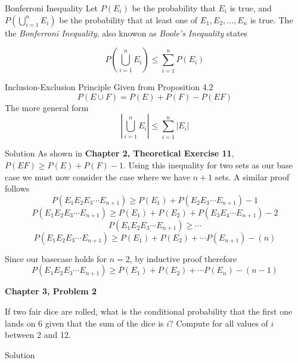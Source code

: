 \documentclass{article}
\begin{document}
\begin{spacing}{1.1}
\begin{homeworkProblem}
  \begin{homeworkSection}{Bonferroni Inequality}
    Let $P( E_i)$ be the probability that $E_i$ is true, and $P\left( \bigcup\limits_{i = 1}^{n}{ E_i}\right)$ be the probability 
    that at least one of $E_1, E_2, \dots, E_n$ is true.  The the \emph{Bonferroni Inequality}, also knowon as \emph{Boole's Inequality} states

    \[P\left( \bigcup\limits_{i = 1}^{n}{ E_i}\right) \le \sum\limits_{i = 1}^{n}{ P( E_i)}\]
  \end{homeworkSection}	

  \begin{homeworkSection}{Inclusion-Exclusion Principle}
    Given from Proposition 4.2
      \[P( E \cup F) = P( E) + P( F) - P( EF)\]
    The more general form
      \[\left|\bigcup\limits_{i = 1}^{n}{ E_i}\right| \le \sum\limits_{i = 1}^{n}{ \left|E_i\right|}\]
  \end{homeworkSection}

	\begin{homeworkSection}{Solution}
    As shown in {\bf Chapter 2, Theoretical Exercise 11}, $P( EF) \ge P( E) + P( F) - 1$. 
    Using this inequality for two sets as our base case we must now consider the case where
    we have $n + 1$ sets.  A similar proof follows
      \[P( E_1 E_2 E_3 \cdots E_{n + 1}) \ge P( E_1) + P(E_2 E_3 \cdots E_{n + 1}) - 1\]
      \[P( E_1 E_2 E_3 \cdots E_{n + 1}) \ge P( E_1) + P( E_2) + P(E_3 E_4 \cdots E_{n + 1}) - 2\]
      \[P( E_1 E_2 E_3 \cdots E_{n + 1}) \ge \cdots\]
      \[P( E_1 E_2 E_3 \cdots E_{n + 1}) \ge P( E_1) + P( E_2) + \cdots P( E_{n + 1}) - (n)\]

    Since our basecase holds for $n = 2$, by inductive proof therefore 
      \[P( E_1 E_2 E_3 \cdots E_{n + 1}) \ge P( E_1) + P( E_2) + \cdots P( E_{n}) - (n - 1)\]

	\end{homeworkSection}
\end{homeworkProblem}

\begin{homeworkProblem}
  {\bf Chapter 3, Problem 2	}
  
  If two fair dice are rolled, what is the conditional probability that the first one lands 
  on 6 given that the sum of the dice is $i$? Compute for all values of $i$ between 2 and 12.

	\begin{homeworkSection}{Solution}
    
		
	\end{homeworkSection}
\end{homeworkProblem}

\end{spacing}
\end{document}
